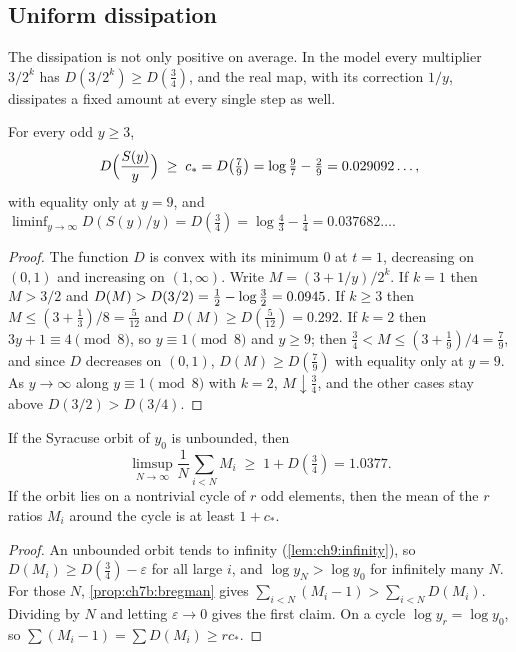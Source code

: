 \subsection{Uniform dissipation}

The dissipation is not only positive on average. In the model every multiplier
$3/2^k$ has $D(3/2^k)\ge D(\tfrac34)$, and the real map, with its correction
$1/y$, dissipates a fixed amount at every single step as well.

\begin{proposition}\label{prop:ch7b:dissipation}
For every odd $y\ge3$,
\[
  D\Bigl(\frac{S(y)}y\Bigr)\;\ge\;c_*=D\bigl(\tfrac79\bigr)=\log\tfrac97-\tfrac29=0.029092\ldots,
\]
with equality only at $y=9$, and $\liminf_{y\to\infty}D(S(y)/y)=D(\tfrac34)=\log\tfrac43-\tfrac14=0.037682\ldots$.
\end{proposition}

\begin{proof}
The function $D$ is convex with its minimum $0$ at $t=1$, decreasing on
$(0,1)$ and increasing on $(1,\infty)$. Write $M=(3+1/y)/2^k$. If $k=1$ then
$M>3/2$ and $D(M)>D(3/2)=\tfrac{1}{2}-\log\tfrac32=0.0945$. If $k\ge3$ then
$M\le(3+\tfrac13)/8=\tfrac5{12}$ and $D(M)\ge D(\tfrac5{12})=0.292$. If $k=2$
then $3y+1\equiv4\pmod8$, so $y\equiv1\pmod8$ and $y\ge9$; then
$\tfrac34<M\le(3+\tfrac19)/4=\tfrac79$, and since $D$ decreases on $(0,1)$,
$D(M)\ge D(\tfrac79)$ with equality only at $y=9$. As $y\to\infty$ along
$y\equiv1\pmod8$ with $k=2$, $M\downarrow\tfrac34$, and the other cases stay
above $D(3/2)>D(3/4)$.
\end{proof}

\begin{corollary}\label{cor:ch7b:outrun}
If the Syracuse orbit of $y_0$ is unbounded, then
\[
  \limsup_{N\to\infty}\frac1N\sum_{i<N}M_i\;\ge\;1+D(\tfrac34)=1.0377.
\]
If the orbit lies on a nontrivial cycle of $r$ odd elements, then the mean of
the $r$ ratios $M_i$ around the cycle is at least $1+c_*$.
\end{corollary}

\begin{proof}
An unbounded orbit tends to infinity (\cref{lem:ch9:infinity}), so
$D(M_i)\ge D(\tfrac34)-\varepsilon$ for all large $i$, and $\log y_N>\log y_0$
for infinitely many $N$. For those $N$, \cref{prop:ch7b:bregman} gives
$\sum_{i<N}(M_i-1)>\sum_{i<N}D(M_i)$. Dividing by $N$ and letting $\varepsilon\to0$
gives the first claim. On a cycle $\log y_r=\log y_0$, so
$\sum(M_i-1)=\sum D(M_i)\ge rc_*$.
\end{proof}

